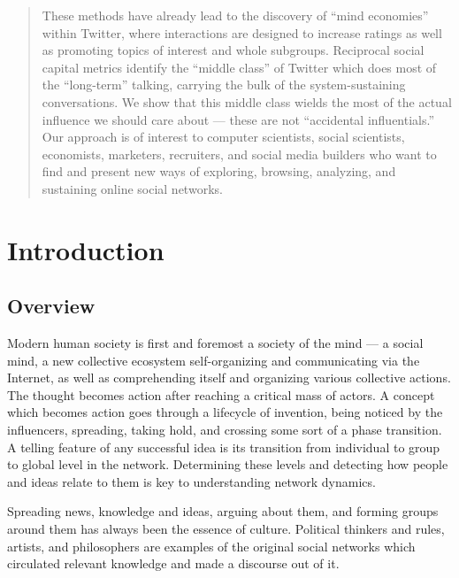 \documentclass[10pt,oneside]{memoir}
\begin{document}
\begin{abstract}
These methods have already lead to the discovery of ``mind economies'' within Twitter, where interactions are designed to increase ratings as well as promoting  topics of interest and whole subgroups. Reciprocal social capital metrics identify the ``middle class'' of Twitter which does most of the ``long-term'' talking, carrying the bulk of the system-sustaining conversations. We show that this middle class wields the most of the actual influence we should care about --- these are not ``accidental influentials.''  Our approach is of interest to computer scientists, social scientists, economists, marketers, recruiters, and social media builders who want to find and present new ways of exploring, browsing, analyzing, and sustaining online social networks.


\pagebreak 
\end{abstract}
\clearpage
\tableofcontents
\clearpage
\listoffigures			%
\clearpage
\listoftables			%
\clearpage


\chapter{Introduction}
\label{introduction}

\section{Overview}
\label{overview}

Modern human society is first and foremost a society of the mind --- a social mind, a new collective ecosystem self-organizing and communicating via the Internet, as well as comprehending itself and organizing various collective actions.  The thought becomes action after reaching a critical mass of actors.   A concept which becomes action goes through a lifecycle of invention, being noticed by the influencers, spreading, taking hold, and crossing some sort of a phase transition.  A telling feature of any successful idea is its transition from individual to group to global level in the network.  Determining these levels and detecting how people and ideas relate to them is key to understanding network dynamics.


Spreading news, knowledge and ideas, arguing about them, and forming groups around them has always been the essence of culture. Political thinkers and rules, artists, and philosophers are examples of the original social networks which circulated relevant knowledge and made a discourse out of it.
\end{document}
